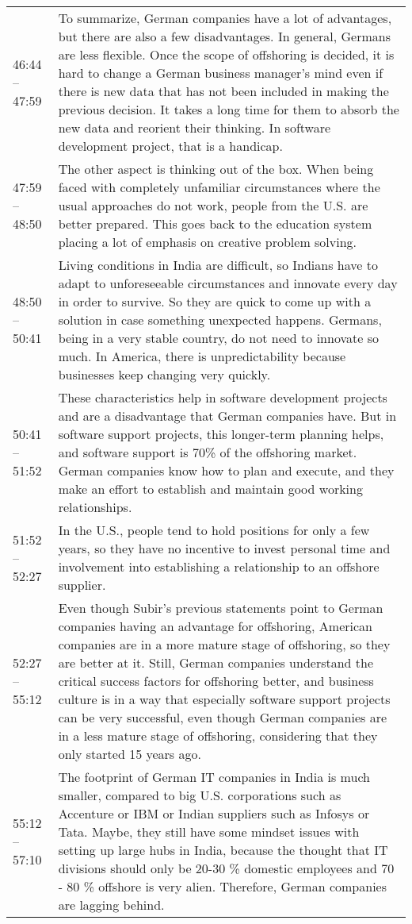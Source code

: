 \begin{appendix}
\begin{longtable}{l p{12.5cm}}
	46:44 -- 47:59&To summarize, German companies have a lot of advantages, but there are also a few disadvantages. In general, Germans are less flexible. Once the scope of offshoring is decided, it is hard to change a German business manager's mind even if there is new data that has not been included in making the previous decision. It takes a long time for them to absorb the new data and reorient their thinking. In software development project, that is a handicap.\\
	47:59 -- 48:50&The other aspect is thinking out of the box. When being faced with completely unfamiliar circumstances where the usual approaches do not work, people from the U.S. are better prepared. This goes back to the education system placing a lot of emphasis on creative problem solving.\\
	48:50 -- 50:41&Living conditions in India are difficult, so Indians have to adapt to unforeseeable circumstances and innovate every day in order to survive. So they are quick to come up with a solution in case something unexpected happens. Germans, being in a very stable country, do not need to innovate so much. In America, there is unpredictability because businesses keep changing very quickly.\\
	50:41 -- 51:52&These characteristics help in software development projects and are a disadvantage that German companies have. But in software support projects, this longer-term planning helps, and software support is 70\% of the offshoring market. German companies know how to plan and execute, and they make an effort to establish and maintain good working relationships.\\
	51:52 -- 52:27&In the U.S., people tend to hold positions for only a few years, so they have no incentive to invest personal time and involvement into establishing a relationship to an offshore supplier.\\
	52:27 -- 55:12&Even though Subir's previous statements point to German companies having an advantage for offshoring, American companies are in a more mature stage of offshoring, so they are better at it. Still, German companies understand the critical success factors for offshoring better, and business culture is in a way that especially software support projects can be very successful, even though German companies are in a less mature stage of offshoring, considering that they only started 15 years ago.\\
	55:12 -- 57:10&The footprint of German IT companies in India is much smaller, compared to big U.S. corporations such as Accenture or IBM or Indian suppliers such as Infosys or Tata. Maybe, they still have some mindset issues with setting up large hubs in India, because the thought that IT divisions should only be 20-30 \% domestic employees and 70 - 80 \% offshore is very alien. Therefore, German companies are lagging behind.\\

\end{longtable}
\end{appendix}
